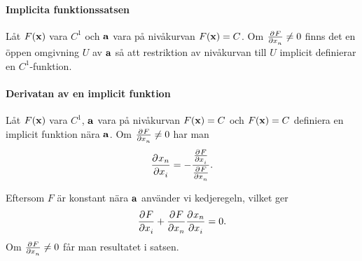 \proof

\paragraph{Implicita funktionssatsen}
Låt $F(\vect{x})$ vara $C^1$ och $\vect{a}$ vara på nivåkurvan $F(\vect{x}) = C$. Om $\pdeval{F}{x_n}{\vect{a}}\neq 0$ finns det en öppen omgivning $U$ av $\vect{a}$ så att restriktion av nivåkurvan till $U$ implicit definierar en $C^1$-funktion.

\proof

\paragraph{Derivatan av en implicit funktion}
Låt $F(\vect{x})$ vara $C^1$, $\vect{a}$ vara på nivåkurvan $F(\vect{x}) = C$ och $F(\vect{x}) = C$ definiera en implicit funktion nära $\vect{a}$. Om $\pdeval{F}{x_n}{\vect{a}}\neq 0$ har man
\begin{align*}
	\pdeval{x_n}{x_i}{\vect{a}'} = -\frac{\pdeval{F}{x_i}{\vect{a}}}{\pdeval{F}{x_n}{\vect{a}}}.
\end{align*}

\proof
Eftersom $F$ är konstant nära $\vect{a}$ använder vi kedjeregeln, vilket ger
\begin{align*}
	\pdeval{F}{x_i}{\vect{a}} + \pdeval{F}{x_n}{\vect{a}}\pdeval{x_n}{x_i}{\vect{a}'} = 0.
\end{align*}
Om $\pdeval{F}{x_n}{\vect{a}}\neq 0$ får man resultatet i satsen.